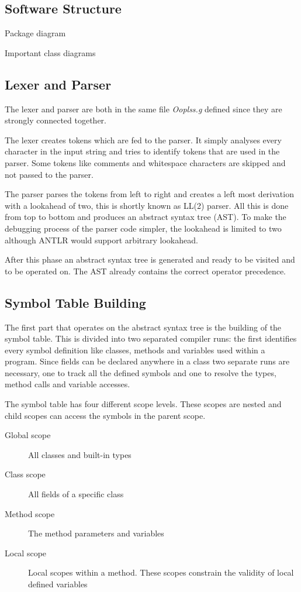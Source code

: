 \subsection{Software Structure}

Package diagram

Important class diagrams

\subsection{Lexer and Parser}
The lexer and parser are both in the same file \emph{Ooplss.g} defined
since they are strongly connected together. 

The lexer creates tokens which are fed to the parser. It simply
analyses every character in the input string and tries to identify tokens
that are used in the parser. Some tokens like comments and whitespace characters 
are skipped and not passed to the parser.

The parser parses the tokens from left to right and creates a left most
derivation with a lookahead of two, this is shortly known as LL(2) parser.
All this is done from top to bottom and produces  an 
abstract syntax tree (AST). To make the debugging
process of the parser code simpler, the lookahead is limited to two although ANTLR
would support arbitrary lookahead.

After this phase an abstract syntax tree is generated and ready to be visited
and to be operated on. The AST already contains the correct operator precedence.

\subsection{Symbol Table Building}
The first part that operates on the abstract syntax tree is the building of
the symbol table. This is divided into two separated compiler runs: the
first identifies every symbol definition like classes, methods and
variables used within a program. Since fields can be declared anywhere
in a class two separate runs are necessary, one to track all the defined
symbols and one to resolve the types, method calls and variable accesses.

The symbol table has four different scope levels. These scopes are nested
and child scopes can access the symbols in the parent scope.
\begin{description}
	\item[Global scope] All classes and built-in types
	\item[Class scope] All fields of a specific class
	\item[Method scope] The method parameters and variables
	\item[Local scope] Local scopes within a method. These scopes
	constrain the validity of local defined variables
\end{description}

